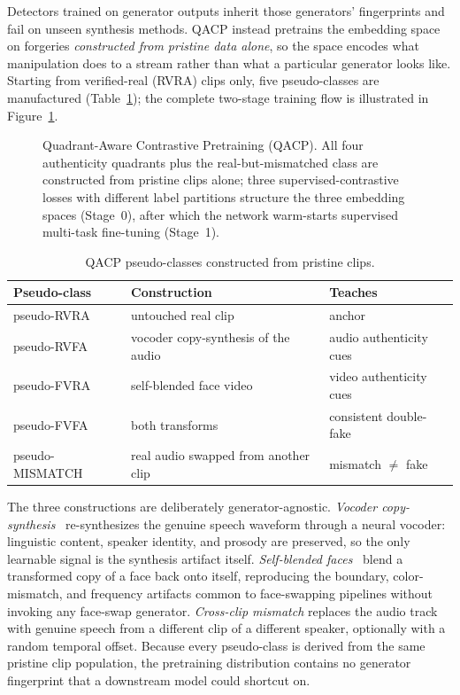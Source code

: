 Detectors trained on generator outputs inherit those generators' fingerprints
and fail on unseen synthesis methods. QACP instead pretrains the embedding
space on forgeries \emph{constructed from pristine data alone}, so the space
encodes what manipulation does to a stream rather than what a particular
generator looks like. Starting from verified-real (RVRA) clips only, five
pseudo-classes are manufactured (Table~\ref{tab:qacp-classes}); the complete
two-stage training flow is illustrated in Figure~\ref{fig:qacp}.

\begin{figure}[htbp]
  \centering
  
  \caption{Quadrant-Aware Contrastive Pretraining (QACP). All four
  authenticity quadrants plus the real-but-mismatched class are constructed
  from pristine clips alone; three supervised-contrastive losses with
  different label partitions structure the three embedding spaces (Stage~0),
  after which the network warm-starts supervised multi-task fine-tuning
  (Stage~1).}
  \label{fig:qacp}
\end{figure}

\begin{table}[htbp]
\centering
\caption{QACP pseudo-classes constructed from pristine clips.}
\label{tab:qacp-classes}
\small
\begin{tabular}{lll}
\toprule
\textbf{Pseudo-class} & \textbf{Construction} & \textbf{Teaches} \\
\midrule
pseudo-RVRA & untouched real clip & anchor \\
pseudo-RVFA & vocoder copy-synthesis of the audio & audio authenticity cues \\
pseudo-FVRA & self-blended face video~\cite{shiohara2022sbi} & video authenticity cues \\
pseudo-FVFA & both transforms & consistent double-fake \\
pseudo-MISMATCH & real audio swapped from another clip & mismatch $\neq$ fake \\
\bottomrule
\end{tabular}
\end{table}

The three constructions are deliberately generator-agnostic.
\emph{Vocoder copy-synthesis}~\cite{wang2023vocoded} re-synthesizes the
genuine speech waveform through a neural vocoder: linguistic content, speaker
identity, and prosody are preserved, so the only learnable signal is the
synthesis artifact itself. \emph{Self-blended faces}~\cite{shiohara2022sbi}
blend a transformed copy of a face back onto itself, reproducing the boundary,
color-mismatch, and frequency artifacts common to face-swapping pipelines
without invoking any face-swap generator. \emph{Cross-clip mismatch} replaces
the audio track with genuine speech from a different clip of a different
speaker, optionally with a random temporal offset. Because every pseudo-class
is derived from the same pristine clip population, the pretraining
distribution contains no generator fingerprint that a downstream model could
shortcut on.

